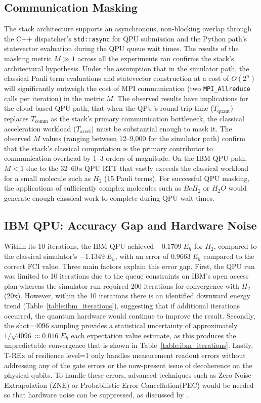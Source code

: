 \subsection{Communication Masking}
The stack architecture supports an asynchronous, non-blocking overlap through the C++ dispatcher's \texttt{std::async} for
QPU submission and the Python path's statevector evaluation during the QPU queue wait times.
The results of the masking metric $M \gg 1$ across all the experiments ran confirms the stack's architectural hypothesis.
Under the assumption that in the simulator path, the classical Pauli term evaluations and statevector construction at a cost of $O(2^n)$ 
will significantly outweigh the cost of MPI communication (two \texttt{MPI\_Allreduce} calls 
per iteration) in the metric $M$. The observed results have implications for the cloud based QPU path, that when the QPU's 
round-trip time ($T_{\text{quant}}$) replaces $T_{\text{comm}}$ as the stack's primary communication bottleneck, the 
classical acceleration workload ($T_{\text{accel}}$) must be substantial enough to mask it. The observed $M$ values 
(ranging between 12--9,000 for the simulator path) confirm that the stack's classical computation is the primary contributor to communication 
overhead by 1--3 orders of magnitude. On the IBM QPU path, $M < 1$ due to the 32--60\,s QPU RTT that vastly exceeds 
the classical workload for a small molecule such as $H_{2}$ (15 Pauli terms). 
For successful QPU masking, the applications of sufficiently complex molecules such as $BeH_2$ or $H_{2}O$ would generate enough classical work to complete during QPU wait times. 

\subsection{IBM QPU: Accuracy Gap and Hardware Noise}
Within its 10 iterations, the IBM QPU achieved $-0.1709\;E_h$ for $H_{2}$, compared to the classical simulator's $-1.1349\;E_h$,
with an error of $0.9663\;E_h$ compared to the correct FCI value. Three main factors explain this error gap. First, 
the QPU run was limited to 10 iterations due to the queue constraints on IBM's open access plan whereas the 
simulator run required 200 iterations for convergence with $H_{2}$ (20x). However, within the 10 iterations there is an identified 
downward energy trend (Table~\ref{table:ibm_iterations}), suggesting that if additional iterations occurred, the quantum hardware would continue to improve the result. 
Secondly, the shot=4096 sampling provides a statistical uncertainty of approximately $1/\sqrt{4096} \approx 0.016\;E_h$ each expectation value estimate, as this produces the unpredictable 
convergence that is shown in Table~\ref{table:ibm_iterations}. Lastly, T-REx of resilience level=1 only handles measurement readout errors without addressing any of the 
gate errors or the now-present issue of decoherence on the physical qubits. To handle these errors, advanced techniques such as Zero Noise Extrapolation (ZNE) 
or Probabilistic Error Cancellation(PEC) would be needed so that hardware noise can be suppressed, as discussed by \textcite{cai2023quantumerrormitigation}.

